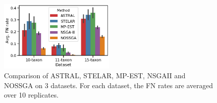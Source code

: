 \begin{figure}
	\begin{adjustwidth}{0cm}{0cm}
		\centering
		\includegraphics[width=0.5\textwidth]{Figure/all_dataset_compare}
		\caption{Comparison of ASTRAL, STELAR, MP-EST, NSGAII and NOSSGA on 3 datasets. For each dataset, the FN rates are averaged over 10 replicates.} \label{fig1}
	\end{adjustwidth}
\end{figure}



